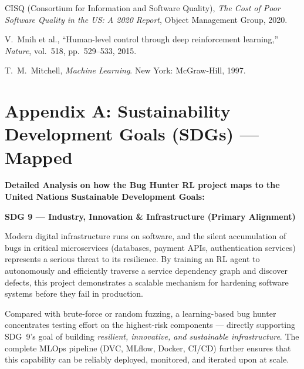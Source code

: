 \documentclass[12pt,a4paper]{report}
\begin{document}
\begin{enumerate}[leftmargin=1.5em, label={[\arabic*]}]
  \item CISQ (Consortium for Information and Software Quality),
        \textit{The Cost of Poor Software Quality in the US: A 2020 Report},
        Object Management Group, 2020.

  \item V.~Mnih et al.,
        ``Human-level control through deep reinforcement learning,''
        \textit{Nature}, vol.~518, pp.~529--533, 2015.

  \item T.~M.~Mitchell,
        \textit{Machine Learning}.
        New York: McGraw-Hill, 1997.

\end{enumerate}

\newpage
\appendix
\chapter*{Appendix A: Sustainability Development Goals (SDGs) --- Mapped}

\textbf{Detailed Analysis on how the Bug Hunter RL project maps to the
United Nations Sustainable Development Goals:}

\vspace{0.4cm}

\textbf{SDG 9 --- Industry, Innovation \& Infrastructure (Primary
Alignment)}

Modern digital infrastructure runs on software, and the silent
accumulation of bugs in critical microservices (databases, payment APIs,
authentication services) represents a serious threat to its resilience.
By training an RL agent to autonomously and efficiently traverse a
service dependency graph and discover defects, this project demonstrates
a scalable mechanism for hardening software systems before they fail in
production.

Compared with brute-force or random fuzzing, a learning-based bug hunter
concentrates testing effort on the highest-risk components --- directly
supporting SDG~9's goal of building \emph{resilient, innovative, and
sustainable infrastructure}.  The complete MLOps pipeline (DVC, MLflow,
Docker, CI/CD) further ensures that this capability can be reliably
deployed, monitored, and iterated upon at scale.

\vspace{0.3cm}
\end{document}
